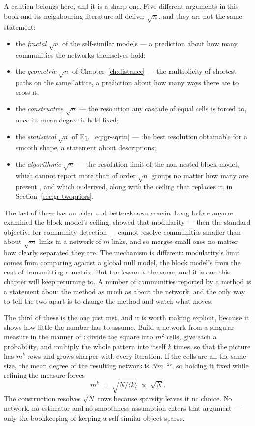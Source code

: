 A caution belongs here, and it is a sharp one. Five different arguments in this
book and its neighbouring literature all deliver $\sqrt{n}$, and they are not the
same statement:

\begin{itemize}
\item the \emph{fractal} $\sqrt{n}$ of the self-similar models --- a prediction
  about how many communities the networks themselves hold;
\item the \emph{geometric} $\sqrt{n}$ of Chapter~\ref{ch:distance} --- the
  multiplicity of shortest paths on the same lattice, a prediction about how many
  ways there are to cross it;
\item the \emph{constructive} $\sqrt{n}$ --- the resolution any cascade of equal
  cells is forced to, once its mean degree is held fixed;
\item the \emph{statistical} $\sqrt{n}$ of Eq.~\eqref{eq:gr-sqrtn} --- the best
  resolution obtainable for a smooth shape, a statement about descriptions;
\item the \emph{algorithmic} $\sqrt{n}$ --- the resolution limit of the
  non-nested block model, which cannot report more than of order $\sqrt{n}$
  groups no matter how many are present \citep{peixoto2014hier}, and which is
  derived, along with the ceiling that replaces it, in
  Section~\ref{sec:gr-twopriors}.
\end{itemize}

\noindent The last of these has an older and better-known cousin. Long before
anyone examined the block model's ceiling, \citet{fortunato2007} showed that
modularity --- then the standard objective for community detection --- cannot
resolve communities smaller than about $\sqrt{m}$ links in a network of $m$
links, and so merges small ones no matter how clearly separated they are. The
mechanism is different: modularity's limit comes from comparing against a global
null model, the block model's from the cost of transmitting a matrix. But the
lesson is the same, and it is one this chapter will keep returning to. A number
of communities reported by a method is a statement about the method as much as
about the network, and the only way to tell the two apart is to change the
method and watch what moves.

The third of these is the one just met, and it is worth making explicit, because it
shows how little the number has to assume. Build a network from a singular measure
in the manner of \citet{palla2010}: divide the square into $m^2$ cells, give each a
probability, and multiply the whole pattern into itself $k$ times, so that the
picture has $m^k$ rows and grows sharper with every iteration. If the cells are all
the same size, the mean degree of the resulting network is $N m^{-2k}$, so holding
it fixed while refining the measure forces
\begin{equation}
  m^{k} \;=\; \sqrt{N/\langle k\rangle} \;\propto\; \sqrt{N} .
  \label{eq:gr-cascade}
\end{equation}
The construction resolves $\sqrt{N}$ rows because sparsity leaves it no choice. No
network, no estimator and no smoothness assumption enters that argument --- only
the bookkeeping of keeping a self-similar object sparse.

